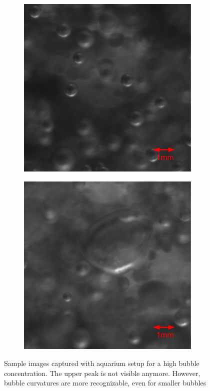					
		\begin{figure}[h]
			\begin{subfigure}[t]{.4\textwidth}
				\centering
				\includegraphics[scale=0.5]{images/aquarium_result_high_conc_1.png}
				\caption{}
				\label{subfig:aquarium_result_sat}
			\end{subfigure}\hfill
			\begin{subfigure}[t]{.4\textwidth}
				\centering
				\includegraphics[scale=0.5]{images/aquarium_result_high_conc_2.png}
				\caption{}
				\label{subfig:too_large_bubble}
			\end{subfigure}\hfill		
			\caption{Sample images captured with aquarium setup for a high bubble concentration. The upper peak is not visible anymore. However, bubble curvatures are more recognizable, even for smaller bubbles}
			\label{fig:aquarium_result_high_conc}
		\end{figure}							
					
